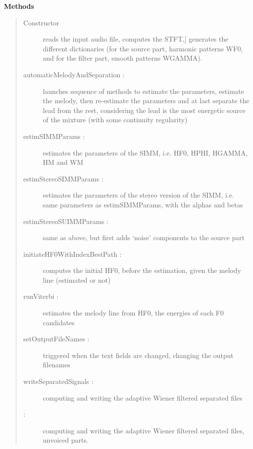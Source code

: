 \documentclass[letterpaper,10pt,english]{sphinxmanual}
\begin{document}
\begin{fulllineitems}
\begin{description}
\begin{description}
\end{description}

\end{description}

\textbf{Methods}
\begin{quote}
\begin{description}
\item[{Constructor}] \leavevmode{[}reads the input audio file, computes the STFT,{]}
generates the different dictionaries (for the source part,
harmonic patterns WF0, and for the filter part, smooth
patterns WGAMMA).

\item[{automaticMelodyAndSeparation :}] \leavevmode
launches sequence of methods to estimate the parameters, estimate the
melody, then re-estimate the parameters and at last separate the
lead from the rest, considering the lead is the most energetic source
of the mixture (with some continuity regularity)

\item[{estimSIMMParams :}] \leavevmode
estimates the parameters of the SIMM, i.e. HF0, HPHI, HGAMMA, HM and WM

\item[{estimStereoSIMMParams :}] \leavevmode
estimates the parameters of the stereo version of the SIMM,
i.e. same parameters as estimSIMMParams, with the alphas and betas

\item[{estimStereoSUIMMParams :}] \leavevmode
same as above, but first adds `noise' components to the source part

\item[{initiateHF0WithIndexBestPath :}] \leavevmode
computes the initial HF0, before the estimation, given the melody line
(estimated or not)

\item[{runViterbi :}] \leavevmode
estimates the melody line from HF0, the energies of each F0 candidates

\item[{setOutputFileNames :}] \leavevmode
triggered when the text fields are changed, changing the output
filenames

\item[{writeSeparatedSignals :}] \leavevmode
computing and writing the adaptive Wiener filtered separated files

\item[{{\hyperref[reference/separateleadstereo:pyfasst.SeparateLeadStereo.SeparateLeadStereoTF.SeparateLeadProcess.writeSeparatedSignalsWithUnvoice]{}} :}] \leavevmode
computing and writing the adaptive Wiener filtered separated files,
unvoiced parts.


\end{description}
\end{quote}
\end{fulllineitems}
\end{document}
